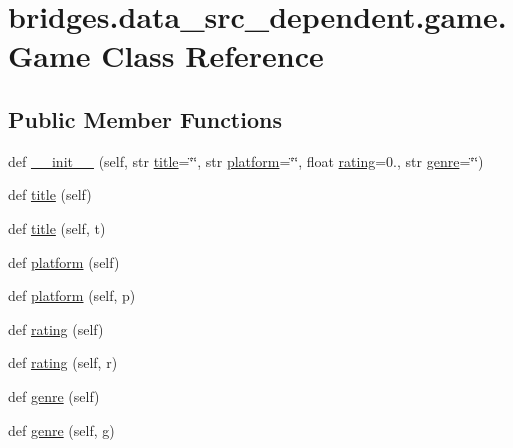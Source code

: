 \hypertarget{classbridges_1_1data__src__dependent_1_1game_1_1_game}{}\section{bridges.\+data\+\_\+src\+\_\+dependent.\+game.\+Game Class Reference}
\label{classbridges_1_1data__src__dependent_1_1game_1_1_game}
\subsection*{Public Member Functions}
\begin{DoxyCompactItemize}
\item 
def \mbox{\hyperlink{classbridges_1_1data__src__dependent_1_1game_1_1_game_ac9d4d11ba7238e8d90723a3d6e5bdf65}{\+\_\+\+\_\+init\+\_\+\+\_\+}} (self, str \mbox{\hyperlink{classbridges_1_1data__src__dependent_1_1game_1_1_game_a05838d85c567aa7ece895ca34ef2051b}{title}}=\char`\"{}\char`\"{}, str \mbox{\hyperlink{classbridges_1_1data__src__dependent_1_1game_1_1_game_a6ded3cef2be4f19c8775f1b6c760d2d5}{platform}}=\char`\"{}\char`\"{}, float \mbox{\hyperlink{classbridges_1_1data__src__dependent_1_1game_1_1_game_a232bceb05cb6b595350deedb7091573b}{rating}}=0., str \mbox{\hyperlink{classbridges_1_1data__src__dependent_1_1game_1_1_game_a280133072fb9bfd6c9ba3c30e3f04dd1}{genre}}=\char`\"{}\char`\"{})
\item 
def \mbox{\hyperlink{classbridges_1_1data__src__dependent_1_1game_1_1_game_a05838d85c567aa7ece895ca34ef2051b}{title}} (self)
\item 
def \mbox{\hyperlink{classbridges_1_1data__src__dependent_1_1game_1_1_game_ae2b0f2f1bbbf2d11c669079b075c6ad1}{title}} (self, t)
\item 
def \mbox{\hyperlink{classbridges_1_1data__src__dependent_1_1game_1_1_game_a6ded3cef2be4f19c8775f1b6c760d2d5}{platform}} (self)
\item 
def \mbox{\hyperlink{classbridges_1_1data__src__dependent_1_1game_1_1_game_ac7b692ca0b04271799d5bdd5117e3102}{platform}} (self, p)
\item 
def \mbox{\hyperlink{classbridges_1_1data__src__dependent_1_1game_1_1_game_a232bceb05cb6b595350deedb7091573b}{rating}} (self)
\item 
def \mbox{\hyperlink{classbridges_1_1data__src__dependent_1_1game_1_1_game_a132b50aaeb278283c91e71baafcd7510}{rating}} (self, r)
\item 
def \mbox{\hyperlink{classbridges_1_1data__src__dependent_1_1game_1_1_game_a280133072fb9bfd6c9ba3c30e3f04dd1}{genre}} (self)
\item 
def \mbox{\hyperlink{classbridges_1_1data__src__dependent_1_1game_1_1_game_a15a0bab4c77405c3825474228dddb470}{genre}} (self, g)
\end{DoxyCompactItemize}



